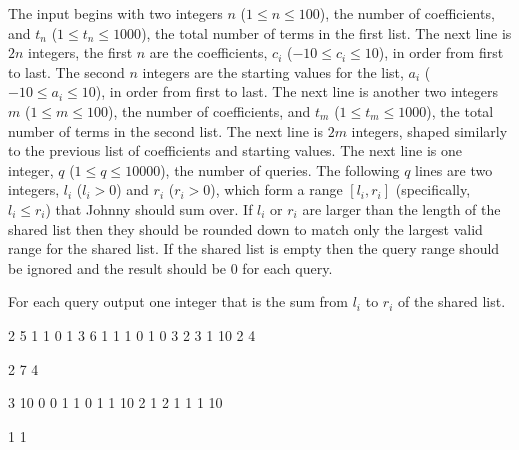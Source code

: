\newpage
\begin{formalin}
The input begins with two integers $n$ ($1 \leq n \leq 100$), the number of coefficients, and $t_n$ ($1 \leq t_n \leq 1000$), the total number of terms in the first list.
The next line is $2n$ integers, the first $n$ are the coefficients, $c_i$ ($-10 \leq c_i \leq 10$), in order from first to last.
The second $n$ integers are the starting values for the list, $a_i$ ($-10 \leq a_i \leq 10$), in order from first to last.
The next line is another two integers $m$ ($1 \leq m \leq 100$), the number of coefficients, and $t_m$ ($1 \leq t_m \leq 1000$), the total number of terms in the second list.
The next line is $2m$ integers, shaped similarly to the previous list of coefficients and starting values.
The next line is one integer, $q$ ($1 \leq q \leq 10000$), the number of queries.
The following $q$ lines are two integers, $l_i$ ($l_i > 0$) and $r_i$ ($r_i > 0$), which form a range $[l_i, r_i]$ (specifically, $l_i \leq r_i$) that Johnny should sum over.
If $l_i$ or $r_i$ are larger than the length of the shared list then they should be rounded down to match only the largest valid range for the shared list.
If the shared list is empty then the query range should be ignored and the result should be $0$ for each query.
\end{formalin}

\begin{formalout}
For each query output one integer that is the sum from $l_i$ to $r_i$ of the shared list.
\end{formalout}

\begin{datain}
2 5
1 1 0 1
3 6
1 1 1 0 1 0
3
2 3
1 10
2 4
\end{datain}
\begin{dataout}
2
7
4
\end{dataout}

\begin{datain}
3 10
0 0 1 1 0 1
1 10
2 1
2
1 1
1 10
\end{datain}
\begin{dataout}
1
1
\end{dataout}
